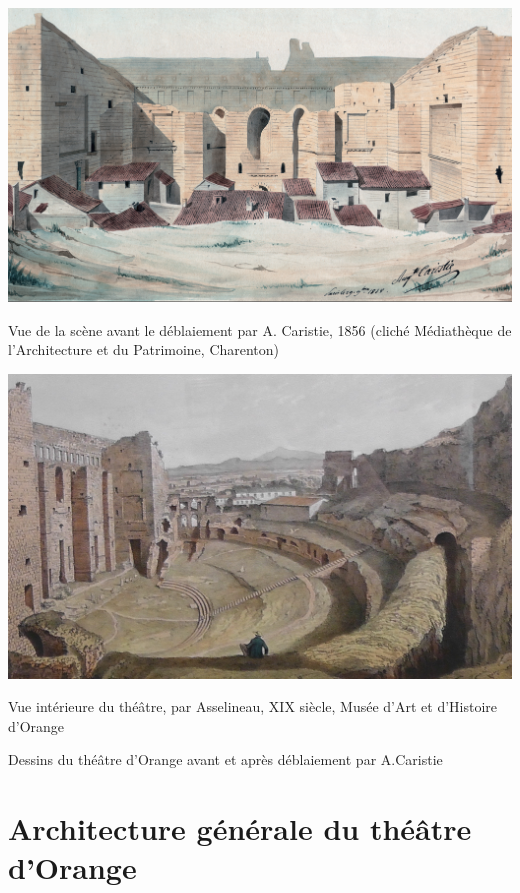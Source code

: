 		
\begin{figureth}
	\begin{subfigureth}{0.49\textwidth}
		\includegraphics[width=\linewidth]{images/av_deblaiement}
		\caption{Vue de la scène avant le déblaiement par A. Caristie, 1856 (cliché Médiathèque de l’Architecture et du Patrimoine, Charenton)}
		\label{av_deblaiement}
	\end{subfigureth}
	\begin{subfigureth}{0.47\textwidth}
		\includegraphics[width=\linewidth]{images/asselineau}
		\caption{Vue intérieure du théâtre, par Asselineau, XIX siècle, Musée d'Art et d'Histoire d'Orange}
	\end{subfigureth}
	\caption[Théâtre d'Orange avant restauration]{Dessins du théâtre d'Orange avant et après déblaiement par A.Caristie}		
\end{figureth}		

		
	\chapter{Architecture générale du théâtre d'Orange}
		\minitoc
		\newpage
		
